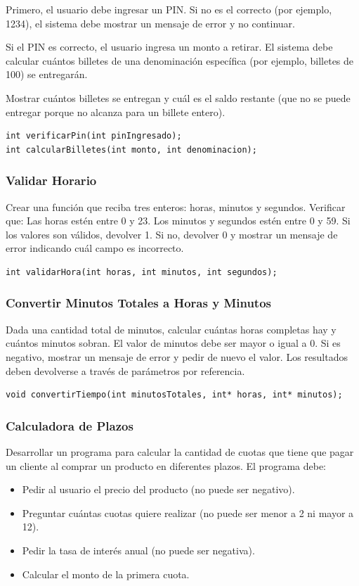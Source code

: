 Primero, el usuario debe ingresar un PIN. Si no es el correcto (por ejemplo, 1234), el sistema debe mostrar un mensaje de error y no continuar.

Si el PIN es correcto, el usuario ingresa un monto a retirar. El sistema debe calcular cuántos billetes de una denominación específica (por ejemplo, billetes de 100) se entregarán.

Mostrar cuántos billetes se entregan y cuál es el saldo restante (que no se puede entregar porque no alcanza para un billete entero).
\begin{lstlisting}[style=customc, basicstyle=\ttfamily]
int verificarPin(int pinIngresado);
int calcularBilletes(int monto, int denominacion);
\end{lstlisting}


\subsubsection{Validar Horario}
Crear una función que reciba tres enteros: horas, minutos y segundos. Verificar que:
Las horas estén entre 0 y 23.
Los minutos y segundos estén entre 0 y 59.
Si los valores son válidos, devolver 1. Si no, devolver 0 y mostrar un mensaje de error indicando cuál campo es incorrecto.
\begin{lstlisting}[style=customc, basicstyle=\ttfamily]
int validarHora(int horas, int minutos, int segundos); 
\end{lstlisting}

\subsubsection{Convertir Minutos Totales a Horas y Minutos}
Dada una cantidad total de minutos, calcular cuántas horas completas hay y cuántos minutos sobran.
El valor de minutos debe ser mayor o igual a 0. Si es negativo, mostrar un mensaje de error y pedir de nuevo el valor.
Los resultados deben devolverse a través de parámetros por referencia.
\begin{lstlisting}[style=customc, basicstyle=\ttfamily]
void convertirTiempo(int minutosTotales, int* horas, int* minutos);
\end{lstlisting}

\subsubsection{Calculadora de Plazos}
Desarrollar un programa para calcular la cantidad de cuotas que tiene que pagar un cliente al comprar un producto en diferentes plazos. El programa debe:
\begin{itemize}
  \item Pedir al usuario el precio del producto (no puede ser negativo).
  \item Preguntar cuántas cuotas quiere realizar (no puede ser menor a 2 ni mayor a 12).
  \item Pedir la tasa de interés anual (no puede ser negativa).
  \item Calcular el monto de la primera cuota.
\end{itemize}

